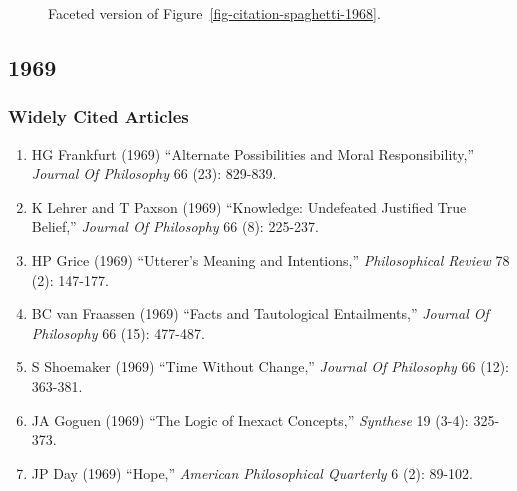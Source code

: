 \documentclass[
  10pt,
  letterpaper,
  DIV=11,
  numbers=noendperiod,
  twoside]{scrartcl}
\providecommand{\tightlist}{%
  \setlength{\itemsep}{0pt}\setlength{\parskip}{0pt}}\usepackage{longtable,booktabs,array}
\begin{document}
\begin{figure}


\caption{\label{fig-citation-facet-1968}Faceted version of
Figure~\ref{fig-citation-spaghetti-1968}.}

\end{figure}%

\newpage

\subsection{1969}\label{sec-s1969}

\subsubsection*{Widely Cited Articles}\label{widely-cited-articles-13}

\begin{enumerate}
\def\labelenumi{\arabic{enumi}.}
\tightlist
\item
  HG Frankfurt (1969) ``Alternate Possibilities and Moral
  Responsibility,'' \emph{Journal Of Philosophy} 66 (23): 829-839.
\item
  K Lehrer and T Paxson (1969) ``Knowledge: Undefeated Justified True
  Belief,'' \emph{Journal Of Philosophy} 66 (8): 225-237.
\item
  HP Grice (1969) ``Utterer's Meaning and Intentions,''
  \emph{Philosophical Review} 78 (2): 147-177.
\item
  BC van Fraassen (1969) ``Facts and Tautological Entailments,''
  \emph{Journal Of Philosophy} 66 (15): 477-487.
\item
  S Shoemaker (1969) ``Time Without Change,'' \emph{Journal Of
  Philosophy} 66 (12): 363-381.
\item
  JA Goguen (1969) ``The Logic of Inexact Concepts,'' \emph{Synthese} 19
  (3-4): 325-373.
\item
  JP Day (1969) ``Hope,'' \emph{American Philosophical Quarterly} 6 (2):
  89-102.
\end{enumerate}
\end{document}
